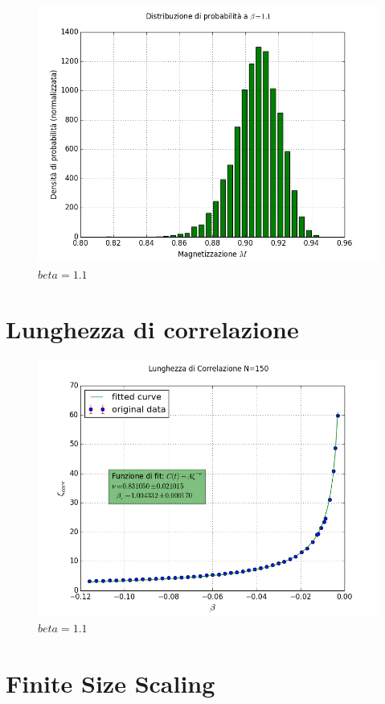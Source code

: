 \begin{center}
\begin{figure}[h]
 	\includegraphics[scale=0.4]{potts/PDFM11.png}
 	\caption{$beta=1.1$}
\end{figure}
\end{center}



\section{Lunghezza di correlazione}


\begin{center}
\begin{figure}[h]
 	\includegraphics[scale=0.65]{potts/corr150.png}
 	\caption{$beta=1.1$}
\end{figure}
\end{center}




\section{Finite Size Scaling}



